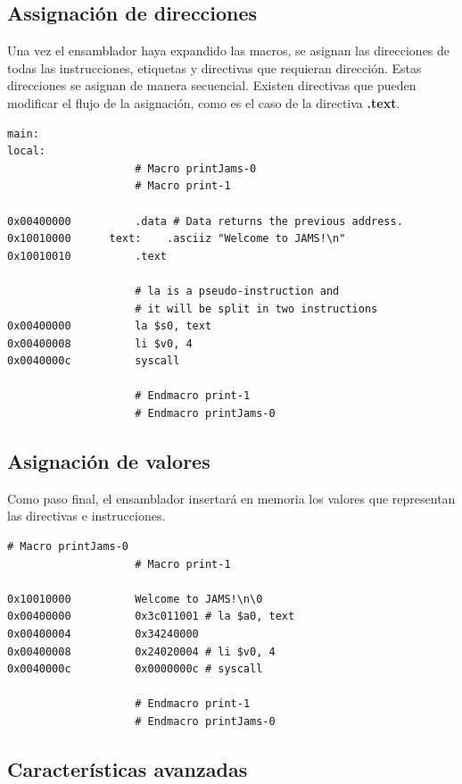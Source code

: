 \subsection{Assignación de direcciones}\label{subsec:assignacion-de-direcciones}

Una vez el ensamblador haya expandido las macros,
se asignan las direcciones de todas las instrucciones,
etiquetas y directivas que requieran dirección.
Estas direcciones se asignan de manera secuencial.
Existen directivas que pueden modificar el flujo de la asignación,
como es el caso de la directiva \textbf{.text}.

\begin{lstlisting}[frame=single,label={lst:address-assignation}]
main:
local:
                    # Macro printJams-0
                    # Macro print-1

0x00400000          .data # Data returns the previous address.
0x10010000      text:    .asciiz "Welcome to JAMS!\n"
0x10010010          .text

                    # la is a pseudo-instruction and
                    # it will be split in two instructions
0x00400000          la $s0, text
0x00400008          li $v0, 4
0x0040000c          syscall

                    # Endmacro print-1
                    # Endmacro printJams-0
\end{lstlisting}

\subsection{Asignación de valores}\label{subsec:asignacion-de-valores}

Como paso final, el ensamblador insertará en memoria los valores
que representan las directivas e instrucciones.

\begin{lstlisting}[frame=single,label={lst:value-assignation}]
                    # Macro printJams-0
                    # Macro print-1

0x10010000          Welcome to JAMS!\n\0
0x00400000          0x3c011001 # la $a0, text
0x00400004          0x34240000
0x00400008          0x24020004 # li $v0, 4
0x0040000c          0x0000000c # syscall

                    # Endmacro print-1
                    # Endmacro printJams-0
\end{lstlisting}

\subsection{Características avanzadas}\label{subsec:características-avanzadas}

